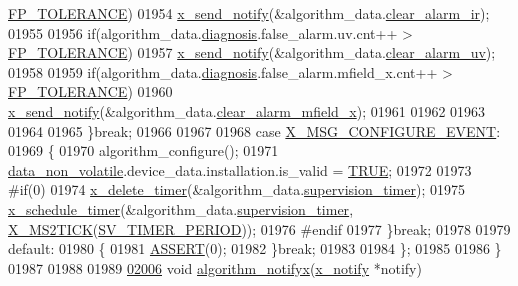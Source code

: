 \begin{DoxyCode}
{{{{{      \hyperlink{a00017_a946f0acff4fd16a65859479e9e0b9513}{FP\_TOLERANCE})
01954               \hyperlink{a00036_ae17b0bb16da3c471bb6074bb4c4d0fee}{x\_send\_notify}(&algorithm\_data.\hyperlink{a00016_a5ef7ebf1a1e20f770d46232ab2be8312}{clear\_alarm\_ir});
01955 
01956               \textcolor{keywordflow}{if}(algorithm\_data.\hyperlink{a00016_a16f85d57ec98b4ad05f5a2e10536b3c6}{diagnosis}.false\_alarm.uv.cnt++ > 
      \hyperlink{a00017_a946f0acff4fd16a65859479e9e0b9513}{FP\_TOLERANCE})
01957               \hyperlink{a00036_ae17b0bb16da3c471bb6074bb4c4d0fee}{x\_send\_notify}(&algorithm\_data.\hyperlink{a00016_a5d8e57dd19de326e75625a8704cfceee}{clear\_alarm\_uv});
01958 
01959               \textcolor{keywordflow}{if}(algorithm\_data.\hyperlink{a00016_a16f85d57ec98b4ad05f5a2e10536b3c6}{diagnosis}.false\_alarm.mfield\_x.cnt++ > 
      \hyperlink{a00017_a946f0acff4fd16a65859479e9e0b9513}{FP\_TOLERANCE})
01960               \hyperlink{a00036_ae17b0bb16da3c471bb6074bb4c4d0fee}{x\_send\_notify}(&algorithm\_data.\hyperlink{a00016_a57101a48bdde96a0db1ec63892095f7c}{clear\_alarm\_mfield\_x});
01961 
01962 
01963 
01964 
01965         \}\textcolor{keywordflow}{break};
01966 
01967 
01968         \textcolor{keywordflow}{case} \hyperlink{a00016_a410c7d83b819fa283303a53830c87a96}{X\_MSG\_CONFIGURE\_EVENT}:
01969         \{
01970             algorithm\_configure();
01971             \hyperlink{a00060_a76ac5f917f5308dcd83de0d7c94559fb}{data\_non\_volatile}.device\_data.installation.is\_valid = 
      \hyperlink{a00040_aa8cecfc5c5c054d2875c03e77b7be15d}{TRUE};
01972 
01973 \textcolor{preprocessor}{#if(0)}
01974           \hyperlink{a00036_ab69e9af4cfa717e870d587906283635c}{x\_delete\_timer}(&algorithm\_data.\hyperlink{a00016_af13eb2dcaed3eca6506489f8ad8fa768}{supervision\_timer});
01975           \hyperlink{a00036_a9e3befaa21e83f196f74201deed85346}{x\_schedule\_timer}(&algorithm\_data.\hyperlink{a00016_af13eb2dcaed3eca6506489f8ad8fa768}{supervision\_timer},
      \hyperlink{a00036_a1732cd929c486b3a225824bb2b3dba36}{X\_MS2TICK}(\hyperlink{a00023_a8a535456285f4602701c814d7b69cc68}{SV\_TIMER\_PERIOD}));
01976 \textcolor{preprocessor}{#endif}
01977         \}\textcolor{keywordflow}{break};
01978     
01979         \textcolor{keywordflow}{default}:
01980         \{
01981             \hyperlink{a00072_abb8ff8e213ac9f6fb21d2b968583b936}{ASSERT}(0);
01982         \}\textcolor{keywordflow}{break};
01983     
01984     \};
01985 
01986 \}
01987 
01988 
01989 
\hypertarget{a00038_source_l02006}{}\hyperlink{a00038_a93269cdec3e21934aa9395440a2de605}{02006} \textcolor{keywordtype}{void} \hyperlink{a00038_a93269cdec3e21934aa9395440a2de605}{algorithm\_notifyx}(\hyperlink{a00036_df/d4c/a00851}{x\_notify} *notify)
}}}}}
\end{DoxyCode}
